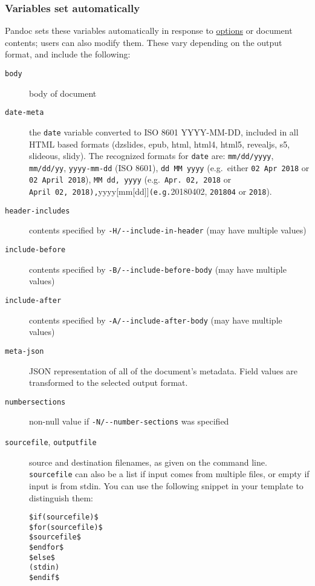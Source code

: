 \hypertarget{variables-set-automatically}{%
\subsubsection{Variables set
automatically}\label{variables-set-automatically}}

Pandoc sets these variables automatically in response to
\protect\hyperlink{options}{options} or document contents; users can
also modify them. These vary depending on the output format, and include
the following:

\begin{description}
\item[\texttt{body}]
body of document
\item[\texttt{date-meta}]
the \texttt{date} variable converted to ISO 8601 YYYY-MM-DD, included in
all HTML based formats (dzslides, epub, html, html4, html5, revealjs,
s5, slideous, slidy). The recognized formats for \texttt{date} are:
\texttt{mm/dd/yyyy}, \texttt{mm/dd/yy}, \texttt{yyyy-mm-dd} (ISO 8601),
\texttt{dd\ MM\ yyyy} (e.g.~either \texttt{02\ Apr\ 2018} or
\texttt{02\ April\ 2018}), \texttt{MM\ dd,\ yyyy}
(e.g.~\texttt{Apr.\ 02,\ 2018} or
\texttt{April\ 02,\ 2018),}yyyy{[}mm{[}dd{]}{]}\texttt{(e.g.}20180402,
\texttt{201804} or \texttt{2018}).
\item[\texttt{header-includes}]
contents specified by \texttt{-H/-\/-include-in-header} (may have
multiple values)
\item[\texttt{include-before}]
contents specified by \texttt{-B/-\/-include-before-body} (may have
multiple values)
\item[\texttt{include-after}]
contents specified by \texttt{-A/-\/-include-after-body} (may have
multiple values)
\item[\texttt{meta-json}]
JSON representation of all of the document's metadata. Field values are
transformed to the selected output format.
\item[\texttt{numbersections}]
non-null value if \texttt{-N/-\/-number-sections} was specified
\item[\texttt{sourcefile}, \texttt{outputfile}]
source and destination filenames, as given on the command line.
\texttt{sourcefile} can also be a list if input comes from multiple
files, or empty if input is from stdin. You can use the following
snippet in your template to distinguish them:

\begin{verbatim}
$if(sourcefile)$
$for(sourcefile)$
$sourcefile$
$endfor$
$else$
(stdin)
$endif$
\end{verbatim}


\end{description}
